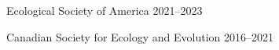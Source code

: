 

\begin{cventries}

  \cventry
    {} %
    {Ecological Society of America} %
    {2021--2023} %
    {} %
    {
    }

  \cventry
    {} %
    {Canadian Society for Ecology and Evolution} %
    {2016--2021} %
    {} %
    {
    }

\end{cventries}
